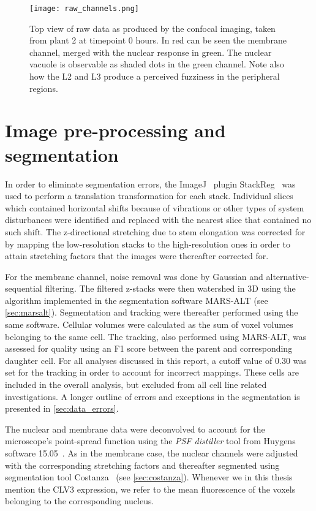 \begin{figure}[H]
  \centering
  \texttt{[image: raw\_channels.png]}
  \caption[Confocal microscopy data]{Top view of raw data as produced by the
    confocal imaging, taken from plant 2 at timepoint 0 hours. In red can be
    seen the membrane channel, merged with the
    nuclear response in green. The nuclear vacuole is observable as shaded dots
    in the green channel. Note also how the L2 and L3 produce a perceived
    fuzziness in the peripheral regions.}
  \label{fig:rawdata}
\end{figure}

\section[Processed image data]{Image pre-processing and segmentation}
In order to eliminate segmentation errors, the ImageJ~\cite{abramoff2004image}
plugin StackReg~\cite{thevenaz1998pyramid} was used
to perform a translation transformation for each stack. Individual slices which
contained horizontal shifts because of vibrations or other types of system
disturbances were identified and replaced with the nearest slice that contained
no such shift. The z-directional stretching due to stem elongation was corrected for by mapping
the low-resolution stacks to the high-resolution ones in order to attain
stretching factors that the images were thereafter corrected for. 

For the membrane channel, noise removal was done by Gaussian and alternative-sequential
filtering. The filtered z-stacks were then watershed in 3D using the
algorithm implemented in the segmentation software MARS-ALT (see
\cref{sec:marsalt}). Segmentation and
tracking were thereafter performed using the same software. Cellular volumes
were calculated as the sum of voxel volumes belonging to the same cell.
The tracking, also performed using MARS-ALT, was assessed for quality using an F1
score between the parent and corresponding daughter cell. For all analyses
discussed in this report, a cutoff value of 0.30 was set for the tracking in
order to account for incorrect mappings. These cells are included in the
overall analysis, but excluded from all cell line related investigations.
A longer outline of errors and exceptions in the segmentation is presented in
\cref{sec:data_errors}.   

The nuclear and membrane data were deconvolved to account for the microscope's point-spread
function using the \textit{PSF distiller} tool from Huygens software
15.05~\cite{ponti2007huygens}. As
in the membrane case, the nuclear channels were adjusted with the  
corresponding stretching factors and thereafter segmented using segmentation
tool Costanza~\cite{costanza} (see \cref{sec:costanza}). Whenever we in this
thesis mention the CLV3 expression, we refer to the mean fluorescence of the
voxels belonging to the corresponding nucleus. 

